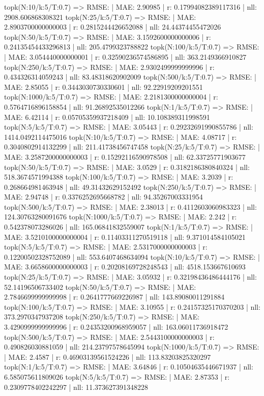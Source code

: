 topk(N:10/k:5/T:0.7) => RMSE: | MAE: 2.90985 | r: 0.17994082389117316 | nll: 2908.606868308321
topk(N:25/k:5/T:0.7) => RMSE: | MAE: 2.8903700000000003 | r: 0.2815244426652088 | nll: 24.44374455472026
topk(N:50/k:5/T:0.7) => RMSE: | MAE: 3.1592600000000006 | r: 0.24135454433296813 | nll: 205.4799323788822
topk(N:100/k:5/T:0.7) => RMSE: | MAE: 3.054440000000001 | r: 0.32590236574586895 | nll: 363.2149366910827
topk(N:250/k:5/T:0.7) => RMSE: | MAE: 2.9302499999999996 | r: 0.434326314059243 | nll: 83.48318620902009
topk(N:500/k:5/T:0.7) => RMSE: | MAE: 2.85055 | r: 0.3443030730330601 | nll: 92.22919209201551
topk(N:1000/k:5/T:0.7) => RMSE: | MAE: 2.2181300000000004 | r: 0.5764716896158854 | nll: 91.26892535012266
topk(N:1/k:5/T:0.7) => RMSE: | MAE: 6.42114 | r: 0.05705359937218409 | nll: 10.108389311998591
topk(N:5/k:5/T:0.7) => RMSE: | MAE: 3.05443 | r: 0.29232691990855786 | nll: 1414.0492114475016
topk(N:10/k:5/T:0.7) => RMSE: | MAE: 4.08717 | r: 0.3040802914132299 | nll: 211.41738456747458
topk(N:25/k:5/T:0.7) => RMSE: | MAE: 3.2587200000000003 | r: 0.15292116590978508 | nll: 62.33725771903677
topk(N:50/k:5/T:0.7) => RMSE: | MAE: 3.0529 | r: 0.3182186380840324 | nll: 518.3674571994388
topk(N:100/k:5/T:0.7) => RMSE: | MAE: 3.2039 | r: 0.268664981463948 | nll: 49.31432629152492
topk(N:250/k:5/T:0.7) => RMSE: | MAE: 2.94748 | r: 0.3376252695668782 | nll: 94.35267003331954
topk(N:500/k:5/T:0.7) => RMSE: | MAE: 2.38013 | r: 0.4112603060983323 | nll: 124.30763280091676
topk(N:1000/k:5/T:0.7) => RMSE: | MAE: 2.242 | r: 0.542378073286026 | nll: 165.06841832559007
topk(N:1/k:5/T:0.7) => RMSE: | MAE: 3.5210100000000004 | r: 0.11403311270519118 | nll: 9.371014584105021
topk(N:5/k:5/T:0.7) => RMSE: | MAE: 2.5317000000000003 | r: 0.12200502328752089 | nll: 553.6407468634094
topk(N:10/k:5/T:0.7) => RMSE: | MAE: 3.6658600000000003 | r: 0.20208169728248543 | nll: 4518.153667610693
topk(N:25/k:5/T:0.7) => RMSE: | MAE: 3.05932 | r: 0.32198436486444176 | nll: 52.14196506733402
topk(N:50/k:5/T:0.7) => RMSE: | MAE: 2.7846699999999998 | r: 0.2641777669226987 | nll: 143.89080011291884
topk(N:100/k:5/T:0.7) => RMSE: | MAE: 3.10955 | r: 0.24157325170370203 | nll: 373.2970347937208
topk(N:250/k:5/T:0.7) => RMSE: | MAE: 3.4290999999999996 | r: 0.24353200968959057 | nll: 163.06011736918472
topk(N:500/k:5/T:0.7) => RMSE: | MAE: 2.5443100000000003 | r: 0.490826030881059 | nll: 214.23797578645994
topk(N:1000/k:5/T:0.7) => RMSE: | MAE: 2.4587 | r: 0.46903139561524226 | nll: 113.83203825320297
topk(N:1/k:5/T:0.7) => RMSE: | MAE: 3.64846 | r: 0.10504635446671937 | nll: 6.585075611809026
topk(N:5/k:5/T:0.7) => RMSE: | MAE: 2.87353 | r: 0.2309778402242297 | nll: 11.373627391348228
